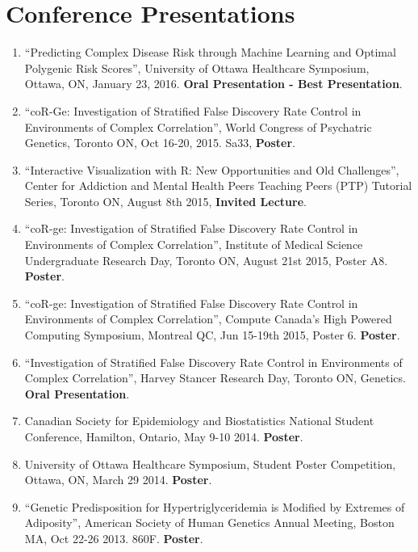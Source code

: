 \documentclass[11pt,a4paper,sans]{moderncv}        %
\begin{document}
\section{Conference Presentations} %
\label{sec:published_abstracts_&_non_refereed_publications}


\begin{enumerate}

\vspace{6pt}

	\item ``Predicting Complex Disease Risk through Machine Learning and Optimal Polygenic Risk Scores'', University of Ottawa Healthcare Symposium, Ottawa, ON, January 23, 2016. \textbf{Oral Presentation - Best Presentation}.
	\item ``coR-Ge: Investigation of Stratified False Discovery Rate Control in Environments of Complex Correlation'', World Congress of Psychatric Genetics, Toronto ON, Oct 16-20, 2015. Sa33, \textbf{Poster}.
	\item ``Interactive Visualization with R: New Opportunities and Old Challenges'', Center for Addiction and Mental Health Peers Teaching Peers (PTP) Tutorial Series, Toronto ON, August 8th 2015, \textbf{Invited Lecture}.
	\item ``coR-ge: Investigation of Stratified False Discovery Rate Control in Environments of Complex Correlation'', Institute of Medical Science Undergraduate Research Day, Toronto ON, August 21st 2015, Poster A8. \textbf{Poster}.
	\item ``coR-ge: Investigation of Stratified False Discovery Rate Control in Environments of Complex Correlation'', Compute Canada’s High Powered Computing Symposium, Montreal QC, Jun 15-19th 2015, Poster 6. \textbf{Poster}.
	\item ``Investigation of Stratified False Discovery Rate Control in Environments of Complex Correlation'', Harvey Stancer Research Day, Toronto ON, Genetics.  \textbf{Oral Presentation}.
	\item Canadian Society for Epidemiology and Biostatistics National Student Conference, Hamilton, Ontario, May 9-10 2014. \textbf{Poster}.
	\item University of Ottawa Healthcare Symposium, Student Poster Competition, Ottawa, ON, March 29 2014. \textbf{Poster}.
	\item ``Genetic Predisposition for Hypertriglyceridemia is Modified by Extremes of Adiposity'', American Society of Human Genetics Annual Meeting, Boston MA, Oct 22-26 2013. 860F. \textbf{Poster}.


\vspace{6pt}

\end{enumerate}
\end{document}
